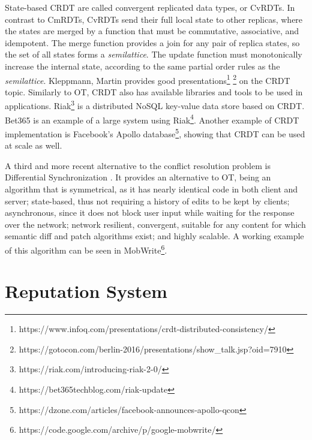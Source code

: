 State-based CRDT are called convergent replicated data types, or CvRDTs. In contrast to CmRDTs, CvRDTs send their full local state to other replicas, where the states are merged by a function that must be commutative, associative, and idempotent. The merge function provides a join for any pair of replica states, so the set of all states forms a \textit{semilattice}. The update function must monotonically increase the internal state, according to the same partial order rules as the \textit{semilattice}. Kleppmann, Martin provides good presentations\footnote{https://www.infoq.com/presentations/crdt-distributed-consistency/} \footnote{https://gotocon.com/berlin-2016/presentations/show\_talk.jsp?oid=7910} on the CRDT topic. Similarly to OT, CRDT also has available libraries and tools to be used in applications. Riak\footnote{https://riak.com/introducing-riak-2-0/} is a distributed NoSQL key-value data store based on CRDT. Bet365 is an example of a large system using Riak\footnote{https://bet365techblog.com/riak-update}. Another example of CRDT implementation is Facebook's Apollo database\footnote{https://dzone.com/articles/facebook-announces-apollo-qcon}, showing that CRDT can be used at scale as well.

A third and more recent alternative to the conflict resolution problem is Differential Synchronization \cite{Fraser2009} \cite{Fraser-diff-sync-web}. It provides an alternative to OT, being an algorithm that is symmetrical, as it has nearly identical code in both client and server; state-based, thus not requiring a history of edits to be kept by clients; asynchronous, since it does not block user input while waiting for the response over the network; network resilient, convergent, suitable for any content for which semantic diff and patch algorithms exist; and highly scalable. A working example of this algorithm can be seen in MobWrite\footnote{https://code.google.com/archive/p/google-mobwrite/}.
    

\section{Reputation System}\label{sec:rep-sys-sota}

